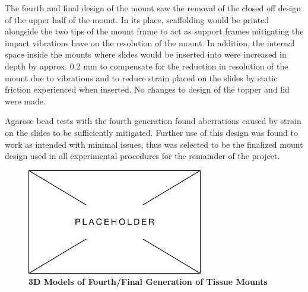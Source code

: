 The fourth and final design of the mount saw the removal of the closed off design of the upper half of the mount. In its place, scaffolding would be printed alongside the two tips of the mount frame to act as support frames mitigating the impact vibrations have on the resolution of the mount. In addition, the internal space inside the mounts where slides would be inserted into were increased in depth by approx. 0.2 mm to compensate for the reduction in resolution of the mount due to vibrations and to reduce strain placed on the slides by static friction experienced when inserted. No changes to design of the topper and lid were made.

Agarose bead tests with the fourth generation found aberrations caused by strain on the slides to be sufficiently mitigated. Further use of this design was found to work as intended with minimal issues, thus was selected to be the finalized mount design used in all experimental procedures for the remainder of the project. 

\begin{figure}[H]
        \centering
        \includegraphics[width=1\linewidth]{Figures/Placeholder.png}
        \caption{\textbf{3D Models of Fourth/Final Generation of Tissue Mounts}}
        \label{fig:enter-label}
    \end{figure}